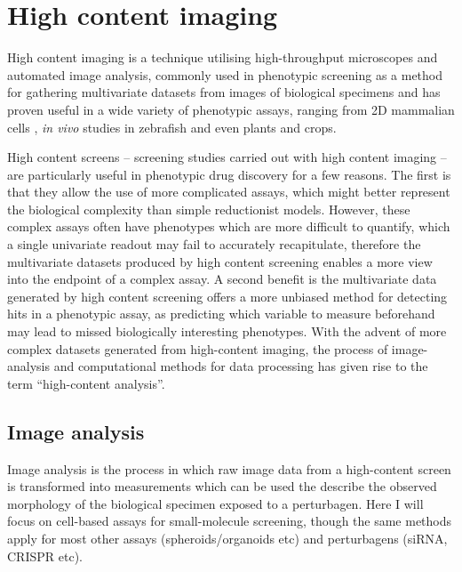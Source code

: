 \documentclass[a4paper,11pt,twoside,openright]{scrbook}
\begin{document}



\section{High content imaging}
High content imaging is a technique utilising high-throughput microscopes and automated image analysis, commonly used in phenotypic screening as a method for gathering multivariate datasets from images of biological specimens and has proven useful in a wide variety of phenotypic assays, ranging from 2D mammalian cells \cite{Leggett2016,Tabata2015}, \textit{in vivo} studies in zebrafish \cite{GeoffreyBurns2005} and even plants and crops. \cite{Chen2014}

High content screens -- screening studies carried out with high content imaging -- are particularly useful in phenotypic drug discovery for a few reasons.
The first is that they allow the use of more complicated assays, which might better represent the biological complexity than simple reductionist models.
However, these complex assays often have phenotypes which are more difficult to quantify, which a single univariate readout may fail to accurately recapitulate,
therefore the multivariate datasets produced by high content screening enables a more view into the endpoint of a complex assay.
A second benefit is the multivariate data generated by high content screening offers a more unbiased method for detecting hits in a phenotypic assay, as predicting which variable to measure beforehand may lead to missed biologically interesting phenotypes.
With the advent of more complex datasets generated from high-content imaging, the process of image-analysis and computational methods for data processing has given rise to the term ``high-content analysis''.


\subsection{Image analysis}
Image analysis is the process in which raw image data from a high-content screen is transformed into measurements which can be used the describe the observed morphology of the biological specimen exposed to a perturbagen.
Here I will focus on cell-based assays for small-molecule screening, though the same methods apply for most other assays (spheroids/organoids etc) and perturbagens (siRNA, CRISPR etc).
\end{document}
